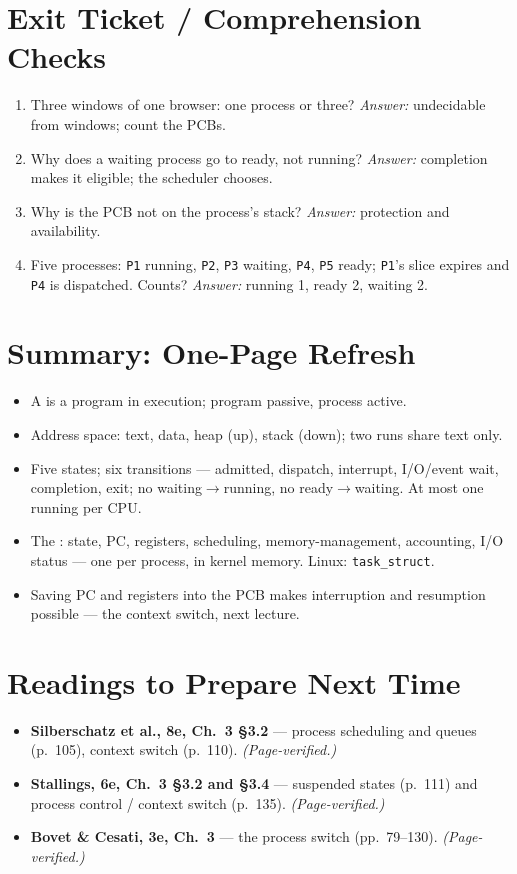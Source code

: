 \documentclass[11pt]{article}
\begin{document}
\section{Exit Ticket / Comprehension Checks}
\begin{enumerate}
  \item Three windows of one browser: one process or three? \emph{Answer:} undecidable from windows; count the PCBs.
  \item Why does a waiting process go to ready, not running? \emph{Answer:} completion makes it eligible; the scheduler chooses.
  \item Why is the PCB not on the process's stack? \emph{Answer:} protection and availability.
  \item Five processes: \texttt{P1} running, \texttt{P2}, \texttt{P3} waiting, \texttt{P4}, \texttt{P5} ready; \texttt{P1}'s slice expires and \texttt{P4} is dispatched. Counts? \emph{Answer:} running 1, ready 2, waiting 2.
\end{enumerate}

\section{Summary: One-Page Refresh}
\begin{itemize}
  \item A  is a program in execution; program passive, process active.
  \item Address space: text, data, heap (up), stack (down); two runs share text only.
  \item Five states; six transitions --- admitted, dispatch, interrupt, I/O/event wait, completion, exit; no waiting$\to$running, no ready$\to$waiting. At most one running per CPU.
  \item The : state, PC, registers, scheduling, memory-management, accounting, I/O status --- one per process, in kernel memory. Linux: \texttt{task\_struct}.
  \item Saving PC and registers into the PCB makes interruption and resumption possible --- the context switch, next lecture.
\end{itemize}

\section{Readings to Prepare Next Time}
\begin{itemize}
  \item \textbf{Silberschatz et al., 8e, Ch.~3 \S3.2} --- process scheduling and queues (p.~105), context switch (p.~110). \emph{(Page-verified.)}
  \item \textbf{Stallings, 6e, Ch.~3 \S3.2 and \S3.4} --- suspended states (p.~111) and process control / context switch (p.~135). \emph{(Page-verified.)}
  \item \textbf{Bovet \& Cesati, 3e, Ch.~3} --- the process switch (pp.~79--130). \emph{(Page-verified.)}
\end{itemize}
\end{document}
